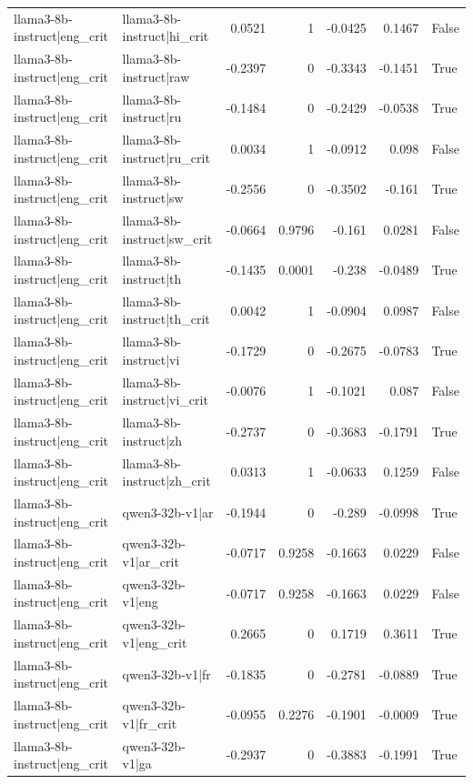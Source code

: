 \begin{table}
\begin{tabular}{l l r r r r l}
llama3-8b-instruct|eng_crit & llama3-8b-instruct|hi_crit & 0.0521 & 1 & -0.0425 & 0.1467 & False \\
llama3-8b-instruct|eng_crit & llama3-8b-instruct|raw & -0.2397 & 0 & -0.3343 & -0.1451 & True \\
llama3-8b-instruct|eng_crit & llama3-8b-instruct|ru & -0.1484 & 0 & -0.2429 & -0.0538 & True \\
llama3-8b-instruct|eng_crit & llama3-8b-instruct|ru_crit & 0.0034 & 1 & -0.0912 & 0.098 & False \\
llama3-8b-instruct|eng_crit & llama3-8b-instruct|sw & -0.2556 & 0 & -0.3502 & -0.161 & True \\
llama3-8b-instruct|eng_crit & llama3-8b-instruct|sw_crit & -0.0664 & 0.9796 & -0.161 & 0.0281 & False \\
llama3-8b-instruct|eng_crit & llama3-8b-instruct|th & -0.1435 & 0.0001 & -0.238 & -0.0489 & True \\
llama3-8b-instruct|eng_crit & llama3-8b-instruct|th_crit & 0.0042 & 1 & -0.0904 & 0.0987 & False \\
llama3-8b-instruct|eng_crit & llama3-8b-instruct|vi & -0.1729 & 0 & -0.2675 & -0.0783 & True \\
llama3-8b-instruct|eng_crit & llama3-8b-instruct|vi_crit & -0.0076 & 1 & -0.1021 & 0.087 & False \\
llama3-8b-instruct|eng_crit & llama3-8b-instruct|zh & -0.2737 & 0 & -0.3683 & -0.1791 & True \\
llama3-8b-instruct|eng_crit & llama3-8b-instruct|zh_crit & 0.0313 & 1 & -0.0633 & 0.1259 & False \\
llama3-8b-instruct|eng_crit & qwen3-32b-v1|ar & -0.1944 & 0 & -0.289 & -0.0998 & True \\
llama3-8b-instruct|eng_crit & qwen3-32b-v1|ar_crit & -0.0717 & 0.9258 & -0.1663 & 0.0229 & False \\
llama3-8b-instruct|eng_crit & qwen3-32b-v1|eng & -0.0717 & 0.9258 & -0.1663 & 0.0229 & False \\
llama3-8b-instruct|eng_crit & qwen3-32b-v1|eng_crit & 0.2665 & 0 & 0.1719 & 0.3611 & True \\
llama3-8b-instruct|eng_crit & qwen3-32b-v1|fr & -0.1835 & 0 & -0.2781 & -0.0889 & True \\
llama3-8b-instruct|eng_crit & qwen3-32b-v1|fr_crit & -0.0955 & 0.2276 & -0.1901 & -0.0009 & True \\
llama3-8b-instruct|eng_crit & qwen3-32b-v1|ga & -0.2937 & 0 & -0.3883 & -0.1991 & True \\

\end{tabular}
\end{table}
